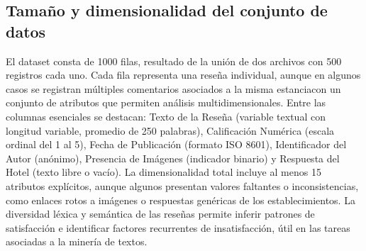 \subsection{Tamaño y dimensionalidad del conjunto de datos  } 
El dataset consta de 1000 filas, resultado de la unión de dos archivos con 500 registros cada uno. Cada fila representa una reseña individual, aunque en algunos casos se registran múltiples comentarios asociados a la misma estanciacon un conjunto de atributos que permiten análisis multidimensionales. Entre las columnas esenciales se destacan: Texto de la Reseña (variable textual con longitud variable, promedio de 250 palabras), Calificación Numérica (escala ordinal del 1 al 5), Fecha de Publicación (formato ISO 8601), Identificador del Autor (anónimo), Presencia de Imágenes (indicador binario) y Respuesta del Hotel (texto libre o vacío). La dimensionalidad total incluye al menos 15 atributos explícitos, aunque algunos presentan valores faltantes o inconsistencias, como enlaces rotos a imágenes o respuestas genéricas de los establecimientos. La diversidad léxica y semántica de las reseñas permite inferir patrones de satisfacción e identificar factores recurrentes de insatisfacción, útil en las tareas asociadas a la minería de textos. 

